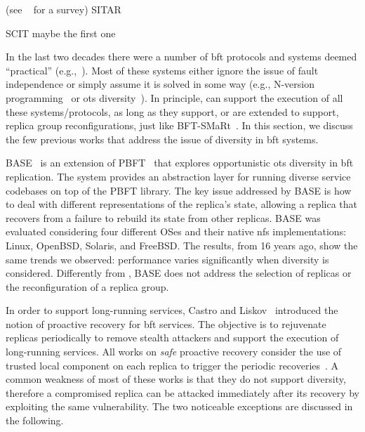 (see ~\cite{Yuan:2014} for a survey)
SITAR~\cite{Wang:2003}

SCIT maybe the first one~\cite{Arsenault:2007}


In the last two decades there were a number of \gls{bft} protocols and systems deemed ``practical'' (e.g.,~\cite{Castro:2002,Kotla:2010,Veronese:2013,Aublin:2015,Behl:2015,Behl:2017,Liu:2016,Yin:2003}).
Most of these systems either ignore the issue of fault independence or simply assume it is solved in some way (e.g., N-version programming~\cite{Chen:1995} or \gls{ots} diversity~\cite{Gashi:2007,Garcia:2014}).
In principle, \system can support the execution of all these systems/protocols, as long as they support, or are extended to support, replica group reconfigurations, just like BFT-SMaRt~\cite{Bessani:2014}.
In this section, we discuss the few previous works that address the issue of diversity in \gls{bft} systems. 

BASE~\cite{Rodrigues:2001} is an extension of PBFT~\cite{Castro:1999} that explores opportunistic \gls{ots} diversity in \gls{bft} replication. 
The system provides an abstraction layer for running diverse service codebases on top of the PBFT library.
The key issue addressed by BASE is how to deal with different representations of the replica's state, allowing a replica that recovers from a failure to rebuild its state from other replicas. 
BASE was evaluated considering four different OSes and their native \gls{nfs} implementations: Linux, OpenBSD, Solaris, and FreeBSD.
The results, from 16 years ago, show the same trends we observed: performance varies significantly when diversity is considered.
Differently from \system, BASE does not address the selection of replicas or the reconfiguration of a replica group.

In order to support long-running services, Castro and Liskov~\cite{Castro:2002} introduced the notion of proactive recovery for \gls{bft} services. 
The objective is to rejuvenate replicas periodically to remove stealth attackers and support the execution of long-running services. 
All works on \emph{safe} proactive recovery consider the use of trusted local component on each replica to trigger the periodic recoveries~\cite{Castro:2002,Sousa:2010,Roeder:2010,Platania:2014,Distler:2011}.
A common weakness of most of these works is that they do not support diversity, therefore a compromised replica can be attacked immediately after its recovery by exploiting the same vulnerability.
The two noticeable exceptions are discussed in the following.

